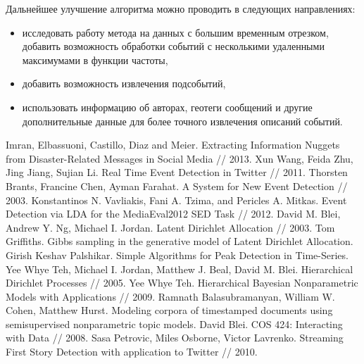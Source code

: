 \documentclass[14pt,a4paper,oneside]{extarticle}
\renewcommand{\baselinestretch}{1.1}
\begin{document}
		Дальнейшее улучшение алгоритма можно проводить в следующих направлениях:
	\begin{itemize}
	\item исследовать работу метода на данных с большим временным отрезком, добавить возможность обработки событий с несколькими удаленными максимумами в функции частоты,
	\item добавить возможность извлечения подсобытий,
	\item использовать информацию об авторах, геотеги сообщений и другие дополнительные данные для более точного извлечения описаний событий.
	\end{itemize}
	
  
\begin{thebibliography}{9}
	Imran, Elbassuoni, Castillo, Diaz and Meier. 
	Extracting Information Nuggets from Disaster-Related Messages in Social Media //
	2013.
	Xun Wang, Feida Zhu, Jing Jiang, Sujian Li.
	Real Time Event Detection in Twitter //
	2011.
	Thorsten Brants, Francine Chen, Ayman Farahat.
	A System for New Event Detection //
	2003.
	Konstantinos N. Vavliakis, Fani A. Tzima, and Pericles A. Mitkas.
	Event Detection via LDA for the MediaEval2012 SED Task //
	2012.
	David M. Blei, Andrew Y. Ng, Michael I. Jordan.
	Latent Dirichlet Allocation //
	2003.
	Tom Griffiths.
	Gibbs sampling in the generative model of Latent Dirichlet Allocation.
	Girish Keshav Palshikar.
	Simple Algorithms for Peak Detection in Time-Series.
	Yee Whye Teh, Michael I. Jordan, Matthew J. Beal, David M. Blei.
	Hierarchical Dirichlet Processes //
	2005.
	Yee Whye Teh.
	Hierarchical Bayesian Nonparametric Models with Applications //
	2009.
	Ramnath Balasubramanyan, William W. Cohen, Matthew Hurst.
	Modeling corpora of timestamped documents using semisupervised nonparametric topic models.
	 David Blei.
	 COS 424: Interacting with Data //
	 2008.
	 Sasa Petrovic, Miles Osborne, Victor Lavrenko.
	 Streaming First Story Detection with application to Twitter //
	 2010.
\end{thebibliography}

\renewcommand{\baselinestretch}{0.4}

\end{document}
